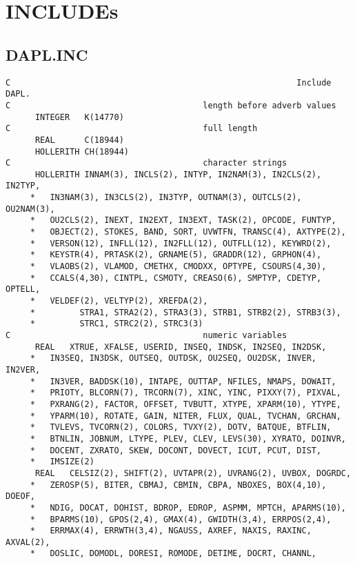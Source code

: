 \section{INCLUDEs}
\subsection{DAPL.INC}

\begin{verbatim}
C                                                          Include DAPL.
C                                       length before adverb values
      INTEGER   K(14770)
C                                       full length
      REAL      C(18944)
      HOLLERITH CH(18944)
C                                       character strings
      HOLLERITH INNAM(3), INCLS(2), INTYP, IN2NAM(3), IN2CLS(2), IN2TYP,
     *   IN3NAM(3), IN3CLS(2), IN3TYP, OUTNAM(3), OUTCLS(2), OU2NAM(3),
     *   OU2CLS(2), INEXT, IN2EXT, IN3EXT, TASK(2), OPCODE, FUNTYP,
     *   OBJECT(2), STOKES, BAND, SORT, UVWTFN, TRANSC(4), AXTYPE(2),
     *   VERSON(12), INFLL(12), IN2FLL(12), OUTFLL(12), KEYWRD(2),
     *   KEYSTR(4), PRTASK(2), GRNAME(5), GRADDR(12), GRPHON(4),
     *   VLAOBS(2), VLAMOD, CMETHX, CMODXX, OPTYPE, CSOURS(4,30),
     *   CCALS(4,30), CINTPL, CSMOTY, CREASO(6), SMPTYP, CDETYP, OPTELL,
     *   VELDEF(2), VELTYP(2), XREFDA(2),
     *         STRA1, STRA2(2), STRA3(3), STRB1, STRB2(2), STRB3(3),
     *         STRC1, STRC2(2), STRC3(3)
C                                       numeric variables
      REAL   XTRUE, XFALSE, USERID, INSEQ, INDSK, IN2SEQ, IN2DSK,
     *   IN3SEQ, IN3DSK, OUTSEQ, OUTDSK, OU2SEQ, OU2DSK, INVER, IN2VER,
     *   IN3VER, BADDSK(10), INTAPE, OUTTAP, NFILES, NMAPS, DOWAIT,
     *   PRIOTY, BLCORN(7), TRCORN(7), XINC, YINC, PIXXY(7), PIXVAL,
     *   PXRANG(2), FACTOR, OFFSET, TVBUTT, XTYPE, XPARM(10), YTYPE,
     *   YPARM(10), ROTATE, GAIN, NITER, FLUX, QUAL, TVCHAN, GRCHAN,
     *   TVLEVS, TVCORN(2), COLORS, TVXY(2), DOTV, BATQUE, BTFLIN,
     *   BTNLIN, JOBNUM, LTYPE, PLEV, CLEV, LEVS(30), XYRATO, DOINVR,
     *   DOCENT, ZXRATO, SKEW, DOCONT, DOVECT, ICUT, PCUT, DIST,
     *   IMSIZE(2)
      REAL   CELSIZ(2), SHIFT(2), UVTAPR(2), UVRANG(2), UVBOX, DOGRDC,
     *   ZEROSP(5), BITER, CBMAJ, CBMIN, CBPA, NBOXES, BOX(4,10), DOEOF,
     *   NDIG, DOCAT, DOHIST, BDROP, EDROP, ASPMM, MPTCH, APARMS(10),
     *   BPARMS(10), GPOS(2,4), GMAX(4), GWIDTH(3,4), ERRPOS(2,4),
     *   ERRMAX(4), ERRWTH(3,4), NGAUSS, AXREF, NAXIS, RAXINC, AXVAL(2),
     *   DOSLIC, DOMODL, DORESI, ROMODE, DETIME, DOCRT, CHANNL,

\end{verbatim}
